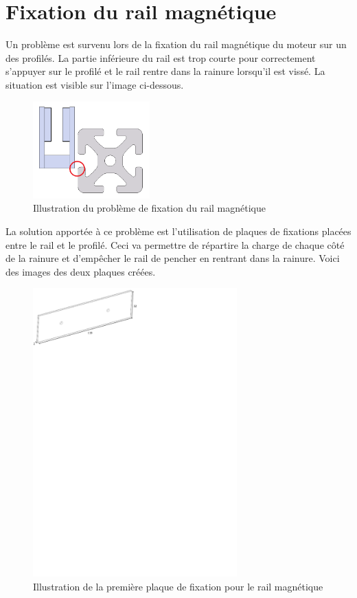 \section{Fixation du rail magnétique}\label{FixRailMag}
Un problème est survenu lors de la fixation du rail magnétique du moteur sur un des profilés. La partie inférieure du rail est trop courte
pour correctement s'appuyer sur le profilé et le rail rentre dans la rainure lorsqu'il est vissé. La situation est visible sur l'image ci-dessous.

\begin{figure}[H]
    \centering
    \includegraphics[width = 0.4\textwidth]{assets/figures/FixationRailMagProb.png}
    \caption{Illustration du problème de fixation du rail magnétique}
    \label{fig:FixRailMagProb}
\end{figure}

La solution apportée à ce problème est l'utilisation de plaques de fixations placées entre le rail et le profilé. Ceci va permettre de répartire
la charge de chaque côté de la rainure et d'empêcher le rail de pencher en rentrant dans la rainure. Voici des images des deux plaques créées.

\begin{figure}[H]
    \centering
    \includegraphics[width = 0.7\textwidth]{assets/figures/PlaqueFixation1.svg}
    \caption{Illustration de la première plaque de fixation pour le rail magnétique}
    \label{fig:PlaqueFix1}
\end{figure}

